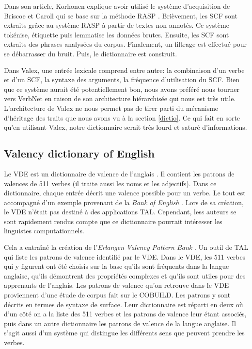 Dans son article, Korhonen explique avoir utilisé le système d'acquisition de Briscoe et Caroll qui se base sur la méthode RASP \citep{BriscoeSecondReleaseRASP2006}. Brièvement, les \ac{SCF} sont extraits grâce au système RASP à partir de textes non-annotés. Ce système tokénise, étiquette puis lemmatise les données brutes. Ensuite, les \ac{SCF} sont extraits des phrases analysées du corpus. Finalement, un filtrage est effectué pour se débarrasser du bruit. Puis, le dictionnaire est construit. 

Dans Valex, une entrée lexicale comprend entre autre: la combinaison d'un verbe et d'un SCF, la syntaxe des arguments, la fréquence d'utilisation du SCF. Bien que ce système aurait été potentiellement bon, nous avons préféré nous tourner vers VerbNet en raison de son architecture hiérarchisée qui nous est très utile. L'architecture de Valex ne nous permet pas de tirer parti du mécanisme d'héritage des traits que nous avons vu à la section \ref{dictio}. Ce qui fait en sorte qu'en utilisant Valex, notre dictionnaire serait très lourd et saturé d'informations.

\subsection{Valency dictionary of English}
Le \acf{VDE} est un dictionnaire de valence de l'anglais \citep{HerbstValencyDictionaryEnglish2004}. Il contient les patrons de valences de 511 verbes (il traite aussi les noms et les adjectifs). Dans ce dictionnaire, chaque entrée décrit une valence possible pour un verbe. Le tout est accompagné d'un exemple provenant de la \emph{Bank of English} . Lors de sa création, le VDE n'était pas destiné à des applications TAL. Cependant, less auteurs se sont rapidement rendus compte que ce dictionnaire pourrait intéresser les linguistes computationnels. 

Cela a entraîné la création de l'\emph{Erlangen Valency Pattern Bank} \citep{faucris.1039365}. Un outil de TAL qui liste les patrons de valence identifié par le VDE.  Dans le VDE, les 511 verbes qui y figurent ont été choisis sur la base qu'ils sont fréquents dans la langue anglaise, qu'ils démontrent des propriétés complexes et qu'ils sont utiles pour des apprenants de l'anglais. Les patrons de valence qu'on retrouve dans le VDE proviennent d'une étude de corpus fait sur le COBUILD. Les patrons y sont décrits en termes de syntaxe de surface.  Leur dictionnaire est réparti en deux où d'un côté on a la liste des 511 verbes et les patrons de valence leur étant associés, puis dans un autre dictionnaire les patrons de valence de la langue anglaise. Il s'agit aussi d'un système qui distingue les différents sens que peuvent prendre les verbes. 

